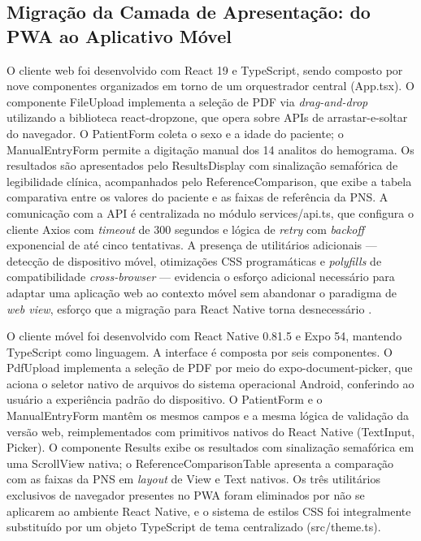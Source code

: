 \documentclass[12pt]{article}
\begin{document}
\subsection{Migração da Camada de Apresentação: do PWA ao Aplicativo Móvel}

O cliente web foi desenvolvido com React 19 e TypeScript, sendo composto
por nove componentes organizados em torno de um orquestrador central
(App.tsx). O componente FileUpload implementa a seleção de PDF via
\textit{drag-and-drop} utilizando a biblioteca react-dropzone, que opera
sobre APIs de arrastar-e-soltar do navegador. O PatientForm coleta o sexo
e a idade do paciente; o ManualEntryForm permite a digitação manual dos
14 analitos do hemograma. Os resultados são apresentados pelo
ResultsDisplay com sinalização semafórica de legibilidade clínica,
acompanhados pelo ReferenceComparison, que exibe a tabela comparativa
entre os valores do paciente e as faixas de referência da PNS. A
comunicação com a API é centralizada no módulo services/api.ts, que
configura o cliente Axios com \textit{timeout} de 300 segundos e lógica
de \textit{retry} com \textit{backoff} exponencial de até cinco tentativas.
A presença de utilitários adicionais — detecção de dispositivo móvel,
otimizações CSS programáticas e \textit{polyfills} de compatibilidade
\textit{cross-browser} — evidencia o esforço adicional necessário para
adaptar uma aplicação web ao contexto móvel sem abandonar o paradigma
de \textit{web view}, esforço que a migração para React Native torna
desnecessário \cite{cardieri2018}.

O cliente móvel foi desenvolvido com React Native 0.81.5 e Expo 54,
mantendo TypeScript como linguagem. A interface é composta por seis
componentes. O PdfUpload implementa a seleção de PDF por meio do
expo-document-picker, que aciona o seletor nativo de arquivos do sistema
operacional Android, conferindo ao usuário a experiência padrão do
dispositivo. O PatientForm e o ManualEntryForm mantêm os mesmos campos
e a mesma lógica de validação da versão web, reimplementados com
primitivos nativos do React Native (TextInput, Picker). O componente
Results exibe os resultados com sinalização semafórica em uma ScrollView
nativa; o ReferenceComparisonTable apresenta a comparação com as faixas
da PNS em \textit{layout} de View e Text nativos. Os três utilitários
exclusivos de navegador presentes no PWA foram eliminados por não se
aplicarem ao ambiente React Native, e o sistema de estilos CSS foi
integralmente substituído por um objeto TypeScript de tema centralizado
(src/theme.ts).
\end{document}
